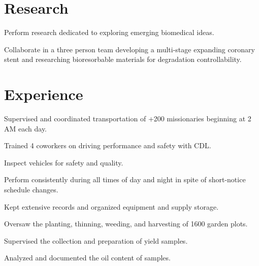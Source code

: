 \documentclass[]{deedy-resume-openfont}
\begin{document}
\sectionsep

\section{Research}
\vspace{1 em}
\begin{tightemize}
\item Perform research dedicated to exploring emerging biomedical ideas. 
\item Collaborate in a three person team developing a multi-stage expanding coronary stent and researching bioresorbable materials for degradation controllability.
\end{tightemize}

\sectionsep


\section{Experience}
\begin{tightemize}
\item Supervised and coordinated transportation of +200 missionaries beginning at 2 AM each day.
\item Trained 4 coworkers on driving performance and safety with CDL.
\item Inspect vehicles for safety and quality.
\item Perform consistently during all times of day and night in spite of short-notice schedule changes.
\end{tightemize}
\sectionsep
{}
\begin{tightemize}
\item Kept extensive records and organized equipment and supply storage.
\item Oversaw the planting, thinning, weeding, and harvesting of 1600 garden plots.
\item Supervised the collection and preparation of yield samples.
\item Analyzed and documented the oil content of samples.
\end{tightemize}
\sectionsep
\end{document}
